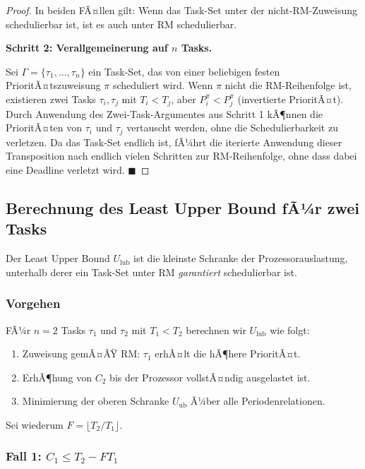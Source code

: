 ﻿\documentclass[a4paper,12pt]{report}
\theoremstyle{definition}
\begin{document}
\begin{proof}
	In beiden FÃ¤llen gilt: Wenn das Task-Set unter der nicht-RM-Zuweisung
	schedulierbar ist, ist es auch unter RM schedulierbar.

	\textbf{Schritt 2: Verallgemeinerung auf $n$ Tasks.}

	Sei $\Gamma = \{\tau_1, \ldots, \tau_n\}$ ein Task-Set, das von einer
	beliebigen festen PrioritÃ¤tszuweisung $\pi$ scheduliert wird. Wenn $\pi$
	nicht die RM-Reihenfolge ist, existieren zwei Tasks $\tau_i, \tau_j$ mit
	$T_i < T_j$, aber $P_i^{\pi} < P_j^{\pi}$ (invertierte PrioritÃ¤t). Durch
	Anwendung des Zwei-Task-Argumentes aus Schritt 1 kÃ¶nnen die PrioritÃ¤ten
	von $\tau_i$ und $\tau_j$ vertauscht werden, ohne die Schedulierbarkeit zu
	verletzen. Da das Task-Set endlich ist, fÃ¼hrt die iterierte Anwendung dieser
	Transposition nach endlich vielen Schritten zur RM-Reihenfolge, ohne dass
	dabei eine Deadline verletzt wird. \hfill$\blacksquare$
\end{proof}

\subsection{Berechnung des Least Upper Bound fÃ¼r zwei Tasks}

Der Least Upper Bound $U_{\text{lub}}$ ist die kleinste Schranke der Prozessorauslastung,
unterhalb derer ein Task-Set unter RM \emph{garantiert} schedulierbar ist.

\subsubsection{Vorgehen}

FÃ¼r $n = 2$ Tasks $\tau_1$ und $\tau_2$ mit $T_1 < T_2$ berechnen wir $U_{\text{lub}}$
wie folgt:
\begin{enumerate}
	\item Zuweisung gemÃ¤ÃŸ RM: $\tau_1$ erhÃ¤lt die hÃ¶here PrioritÃ¤t.
	\item ErhÃ¶hung von $C_2$ bis der Prozessor vollstÃ¤ndig ausgelastet ist.
	\item Minimierung der oberen Schranke $U_{\text{ub}}$ Ã¼ber alle Periodenrelationen.
\end{enumerate}

Sei wiederum $F = \lfloor T_2 / T_1 \rfloor$.

\subsubsection{Fall 1: $C_1 \leq T_2 - F T_1$}
\end{document}
